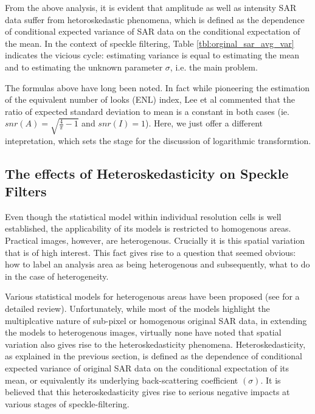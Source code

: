 \documentclass[journal]{IEEEtran}
\begin{document}
From the above analysis, it is evident that amplitude as well as intensity SAR data suffer from hetoroskedastic 
phenomena, which is defined as the dependence of conditional expected variance of SAR data on the conditional 
expectation of the mean. 
In the context of speckle filtering, Table \ref{tbl:orginal_sar_avg_var} indicates the vicious cycle: 
estimating variance is equal to estimating the mean and to estimating the unknown parameter $\sigma$, 
i.e. the main problem. 

The formulas above have long been noted. In fact while pioneering the estimation of the equivalent number of looks 
(ENL) index, Lee et al commented that the ratio of expected standard deviation to mean is a constant in both 
cases (ie. $snr(A)=\sqrt{\frac{4}{\pi}-1}$ and $snr(I)=1$). Here, we just offer a different intepretation, 
which sets the stage for the discussion of logarithmic transformtion. 

\subsection{The effects of Heteroskedasticity on Speckle Filters}

Even though the statistical model within individual resolution cells is well established, the applicability of its 
models is restricted to homogenous areas. 
Practical images, however, are heterogenous. Crucially it is this spatial variation that is of high interest. 
This fact gives rise to a question that seemed obvious: how to label an analysis area as being heterogenous and 
subsequently, what to do in the case of heterogeneity.

Various statistical models for heterogenous areas have been proposed (see \cite{Touzi_2002_TGRS} for a detailed 
review). Unfortunately, while most of the models highlight the multiplcative nature of sub-pixel or homogenous 
original SAR data, in extending the models to heterogenous images, virtually none have noted that spatial variation 
also gives rise to the heteroskedasticity phenomena. 
Heteroskedasticity, as explained in the previous section, is defined as the dependence of conditional expected 
variance of original SAR data on the conditional expectation of its mean, or equivalently its underlying 
back-scattering coefficient $(\sigma)$.
It is believed that this heteroskedasticity gives rise to serious negative impacts at various stages of 
speckle-filtering. 
\end{document}
